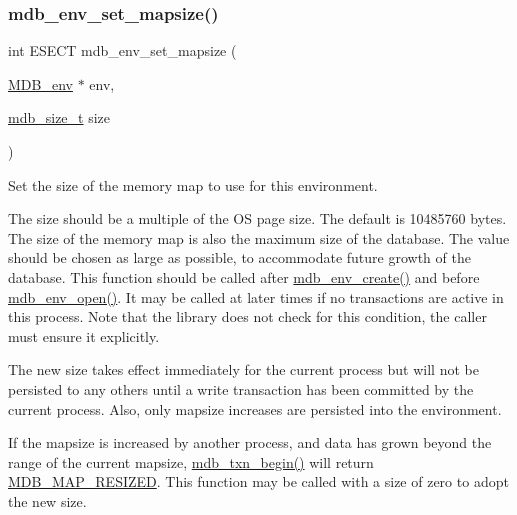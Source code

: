 \subsubsection{\texorpdfstring{mdb\+\_\+env\+\_\+set\+\_\+mapsize()}{mdb\_env\_set\_mapsize()}}
{\footnotesize\ttfamily int E\+S\+E\+CT mdb\+\_\+env\+\_\+set\+\_\+mapsize (\begin{DoxyParamCaption}\item[{\mbox{\hyperlink{struct_m_d_b__env}{M\+D\+B\+\_\+env}} $\ast$}]{env,  }\item[{\mbox{\hyperlink{lmdb_8h_a78821971e612e3898ef4b3ae45ed86f1}{mdb\+\_\+size\+\_\+t}}}]{size }\end{DoxyParamCaption})}



Set the size of the memory map to use for this environment. 

The size should be a multiple of the OS page size. The default is 10485760 bytes. The size of the memory map is also the maximum size of the database. The value should be chosen as large as possible, to accommodate future growth of the database. This function should be called after \mbox{\hyperlink{group__mdb_gaad6be3d8dcd4ea01f8df436f41d158d4}{mdb\+\_\+env\+\_\+create()}} and before \mbox{\hyperlink{group__mdb_ga32a193c6bf4d7d5c5d579e71f22e9340}{mdb\+\_\+env\+\_\+open()}}. It may be called at later times if no transactions are active in this process. Note that the library does not check for this condition, the caller must ensure it explicitly.

The new size takes effect immediately for the current process but will not be persisted to any others until a write transaction has been committed by the current process. Also, only mapsize increases are persisted into the environment.

If the mapsize is increased by another process, and data has grown beyond the range of the current mapsize, \mbox{\hyperlink{group__mdb_gad7ea55da06b77513609efebd44b26920}{mdb\+\_\+txn\+\_\+begin()}} will return \mbox{\hyperlink{group__errors_ga75c014faa4f02ffd234a5ee0e14baa92}{M\+D\+B\+\_\+\+M\+A\+P\+\_\+\+R\+E\+S\+I\+Z\+ED}}. This function may be called with a size of zero to adopt the new size.

